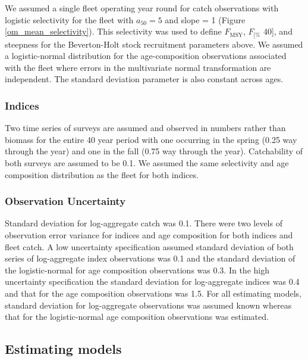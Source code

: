 \documentclass[
  12pt,
]{article}
\newcommand{\Fmsy}{\ensuremath{F_{\text{MSY}}}\xspace}
\newcommand{\Fspr}[1]{\ensuremath{F_{\text{{#1}\%}}}\xspace}
\begin{document}
We assumed a single fleet operating year round for catch observations
with logistic selectivity for the fleet with \(a_{50} = 5\) and slope =
1 (Figure \ref{om_mean_selectivity}). This selectivity was used to
define \Fmsy, \Fspr[40], and steepness for the Beverton-Holt stock
recruitment parameters above. We assumed a logistic-normal distribution
for the age-composition observations associated with the fleet where
errors in the multivariate normal transformation are independent. The
standard deviation parameter is also constant across ages.

\hypertarget{indices}{%
\subsubsection*{Indices}\label{indices}}

Two time series of surveys are assumed and observed in numbers rather
than biomass for the entire 40 year period with one occurring in the
spring (0.25 way through the year) and one in the fall (0.75 way through
the year). Catchability of both surveys are assumed to be 0.1. We
assumed the same selectivity and age composition distribution as the
fleet for both indices.

\hypertarget{observation-uncertainty}{%
\subsubsection*{Observation Uncertainty}\label{observation-uncertainty}}

Standard deviation for log-aggregate catch was 0.1. There were two
levels of observation error variance for indices and age composition for
both indices and fleet catch. A low uncertainty specification assumed
standard deviation of both series of log-aggregate index observations
was 0.1 and the standard deviation of the logistic-normal for age
composition observations was 0.3. In the high uncertainty specification
the standard deviation for log-aggregate indices was 0.4 and that for
the age composition observations was 1.5. For all estimating models,
standard deviation for log-aggregate observations was assumed known
whereas that for the logistic-normal age composition observations was
estimated.

\hypertarget{estimating-models}{%
\subsection*{Estimating models}\label{estimating-models}}
\end{document}
